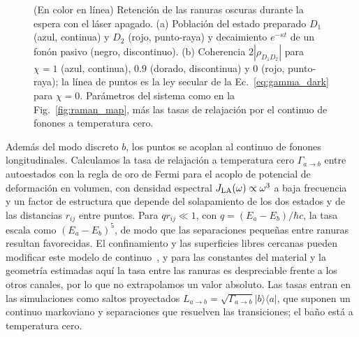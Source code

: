 \documentclass[aps,pra,twocolumn,groupedaddress,amsmath,amssymb,floatfix]{revtex4-2}
\newcommand{\ket}[1]{\lvert #1\rangle}
\newcommand{\bra}[1]{\langle #1\rvert}
\begin{document}
\begin{figure}[t]
	\centering
	\resizebox{\columnwidth}{!}{}
	\caption{(En color en l\'inea) Retenci\'on de las ranuras oscuras durante la espera con el l\'aser apagado. (a) Poblaci\'on del estado preparado $D_1$ (azul, continua) y $D_2$ (rojo, punto-raya) y decaimiento $e^{-\kappa t}$ de un fon\'on pasivo (negro, discontinuo). (b) Coherencia $2|\rho_{D_1D_2}|$ para $\chi=1$ (azul, continua), $0.9$ (dorado, discontinua) y $0$ (rojo, punto-raya); la l\'inea de puntos es la ley secular de la Ec.~\eqref{eq:gamma_dark} para $\chi=0$. Par\'ametros del sistema como en la Fig.~\ref{fig:raman_map}, m\'as las tasas de relajaci\'on por el continuo de fonones a temperatura cero.}
	\label{fig:storage}
\end{figure}

Adem\'as del modo discreto $b$, los puntos se acoplan al continuo de fonones longitudinales. Calculamos la tasa de relajaci\'on a temperatura cero $\Gamma_{a\to b}$ entre autoestados con la regla de oro de Fermi para el acoplo de potencial de deformaci\'on en volumen, con densidad espectral $J_{\rm LA}(\omega)\propto\omega^3$ a baja frecuencia~\cite{krummheuer2002} y un factor de estructura que depende del solapamiento de los dos estados y de las distancias $r_{ij}$ entre puntos. Para $qr_{ij}\ll1$, con $q=(E_a-E_b)/\hbar c$, la tasa escala como $(E_a-E_b)^5$, de modo que las separaciones peque\~nas entre ranuras resultan favorecidas. El confinamiento y las superficies libres cercanas pueden modificar este modelo de continuo~\cite{krummheuer2005}, y para las constantes del material y la geometr\'ia estimadas aqu\'i la tasa entre las ranuras es despreciable frente a los otros canales, por lo que no extrapolamos un valor absoluto. Las tasas entran en las simulaciones como saltos proyectados $L_{a\to b}=\sqrt{\Gamma_{a\to b}}\ket b\bra a$, que suponen un continuo markoviano y separaciones que resuelven las transiciones; el ba\~no est\'a a temperatura cero.
\end{document}
